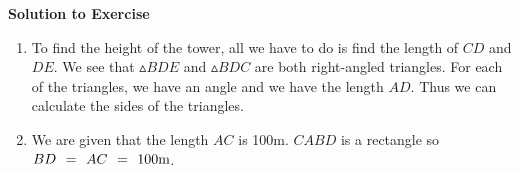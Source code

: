 {\begin{mdframed}[linewidth=4, leftmargin=40, rightmargin=40]
\begin{exercise}
\begin{figure}[H]
\begin{center}
      \vspace{2pt}
    \vspace{.1in}
    
    \end{center}

 \end{figure}   

    \addtocounter{footnote}{-0}
    
        \par 
        
        \vspace{5pt}
        \label{m39411*solfhsst!!!underscore!!!id1394}\noindent\textbf{Solution to Exercise } \label{m39411*listfhsst!!!underscore!!!id1394}\begin{enumerate}[noitemsep, label=\textbf{Step} \textbf{\arabic*}. ] 
            \leftskip=20pt\rightskip=\leftskip\item  
        \label{m39411*id81976}To find the height of the tower, all we have to do is find the length of \begin{math}CD\end{math} and \begin{math}DE\end{math}. We see that \begin{math}▵BDE\end{math} and \begin{math}▵BDC\end{math} are both right-angled triangles. For each of the triangles, we have an angle and we have the length \begin{math}AD\end{math}. Thus we can calculate the sides of the triangles.\par 
        \item  
        \label{m39411*id82067}We are given that the length \begin{math}AC\end{math} is 100m. \begin{math}CABD\end{math} is a rectangle so \begin{math}BD\phantom{\rule{4pt}{0ex}}=\phantom{\rule{4pt}{0ex}}AC\phantom{\rule{4pt}{0ex}}=\phantom{\rule{4pt}{0ex}}100\mathrm{m}\end{math}.\par 
        \label{m39411*id82138}\nopagebreak\noindent{}
\end{enumerate}
\end{exercise}
\end{mdframed}}
